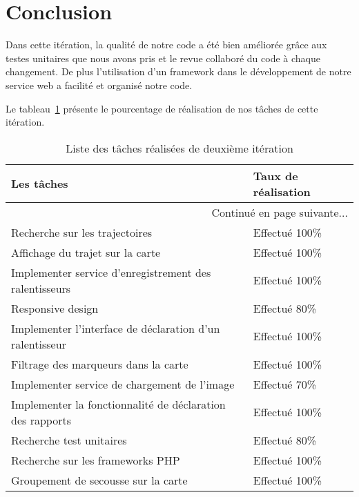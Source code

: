 

\section*{Conclusion}

Dans cette itération, la qualité de notre code a été bien améliorée grâce aux
testes unitaires que nous avons pris et le revue collaboré du code à chaque
changement. De plus l'utilisation d'un framework dans le développement de
notre service web a facilité et organisé notre code.

Le tableau~\ref{tab:sprint2-evaluation} présente le pourcentage de
réalisation de nos tâches de cette itération.
\begin{center}
    \begin{longtable}{| l | l |}
        \caption{Liste des tâches réalisées de deuxième itération}
\label{tab:sprint2-evaluation} \\

        \hline
        \textbf{Les tâches} & \textbf{Taux de réalisation} \\ \hline
        \endhead

        \hline \multicolumn{2}{|r|}{{Continué en page suivante$\dotsc$}} \\ \hline
        \endfoot

        \hline \hline
        \endlastfoot

        \hline
Recherche sur les trajectoires & Effectué 100\% \\ \hline
Affichage du trajet sur la carte & Effectué 100\% \\ \hline
Implementer service d'enregistrement des ralentisseurs & Effectué 100\% \\ \hline
Responsive design & Effectué 80\% \\ \hline
Implementer l'interface de déclaration d'un ralentisseur & Effectué 100\% \\ \hline
Filtrage des marqueurs dans la carte & Effectué 100\% \\ \hline
Implementer service de chargement de l'image & Effectué 70\% \\ \hline
Implementer la fonctionnalité de déclaration des rapports & Effectué 100\% \\ \hline
Recherche test unitaires & Effectué 80\% \\ \hline
Recherche sur les frameworks PHP & Effectué 100\% \\ \hline
Groupement de secousse sur la carte & Effectué 100\% \\ \hline
    \end{longtable}
\end{center}
